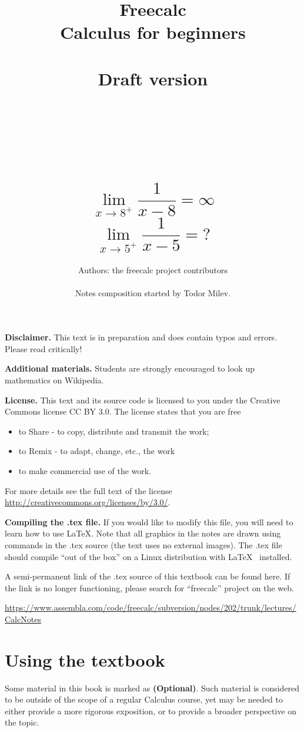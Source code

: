 \documentclass[12pt]{book}
\author{Authors: the freecalc project contributors \\~\\ Notes composition started by Todor Milev.}
\title{Freecalc \\ Calculus for beginners \\ ~ \\Draft version \\ ~\\~\\~\\~\\
\[
\lim\limits_{x\to 8^+}\frac{1}{x-8}=\infty 
\]
\[
\lim\limits_{x\to 5^+}\frac{1}{x-5}= ?
\]
}
\newcommand{\optionalMaterial}{\textbf{(Optional)}}
\begin{document}
\maketitle



\noindent \textbf{Disclaimer. } This text is in preparation and does contain typos and errors. Please read critically!

\noindent \textbf{Additional materials.} Students are strongly encouraged to look up mathematics on Wikipedia. 


\noindent\textbf{License.} This text and its source code is licensed to you under the Creative Commons license CC BY 3.0. The license states that you are free
\begin{itemize}
\item to Share - to copy, distribute and transmit the work;
\item to Remix - to adapt, change, etc., the work
\item to make commercial use of the work.
\end{itemize}

For more details see the full text of the license \url{http://creativecommons.org/licenses/by/3.0/}.

\noindent \textbf{Compiling the .tex file.} If you would like to modify this file, you will need to learn how to use \LaTeX. Note that all graphics in the notes are drawn using commands in the .tex source (the text uses no external images). The .tex file should compile ``out of the box'' on a Linux distribution with \LaTeX~ installed.

A semi-permanent link of the .tex source of this textbook can be found here. If the link is no longer functioning, please search for ``freecalc'' project on the web.

\url{https://www.assembla.com/code/freecalc/subversion/nodes/202/trunk/lectures/CalcNotes}

\tableofcontents



\chapter{Using the textbook}

Some material in this book is marked as \optionalMaterial. Such material is considered to be outside of the scope of a regular Calculus course, yet may be needed to either provide a more rigorous exposition, or to provide a broader perspective on the topic. 
\end{document}
